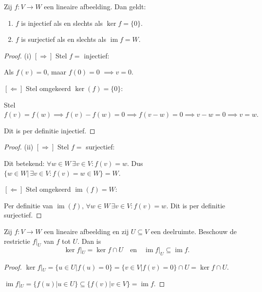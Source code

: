 \begin{lemma}[3.2.4]
    Zij $f \colon V \to W$ een lineaire afbeelding. Dan geldt:
    \begin{enumerate}
        \item[(i)] $f$ is injectief als en slechts als $\ker f = \{0\}$.
        \item[(ii)] $f$ is surjectief als en slechts als $\operatorname{im} f = W$.
    \end{enumerate}
\end{lemma}
\begin{proof}(i)
    \([\Rightarrow]\) Stel \(f = \) injectief:

    Als \(f(v) = 0\), maar \(f(0) = 0\)
    \(\implies v = 0\).

    \([\Leftarrow]\) Stel omgekeerd \(\ker (f) = \{0\}\):

    Stel
    \(
        f(v) = f(w)
         \implies f(v) - f(w) = 0
            \implies f(v-w) = 0
         \implies v-w = 0
         \implies v = w.
    \)

    Dit is per definitie injectief.
\end{proof}
\begin{proof}(ii)
    \([\Rightarrow]\) Stel \(f = \) surjectief:

    Dit betekend: \(\forall w \in W \, \exists v \in V: f(v) = w\).
    Dus \(\{w \in W |\, \exists v \in V: f(v) = w \in W \} = W\).

    \([\Leftarrow]\) Stel omgekeerd \(\operatorname{im} (f) = W\):

    Per definitie van \(\operatorname{im}(f),\, \forall w \in W \,\exists v \in V: f(v) = w \).
    Dit is per definitie surjectief.
\end{proof}

\begin{lemma}[3.2.5]
    Zij $f \colon V \to W$ een lineaire afbeelding en zij $U \subseteq V$ een deelruimte. Beschouw de restrictie $f|_U$ van $f$ tot $U$. Dan is
    \[ \ker f|_U = \ker f \cap U \quad \text{en} \quad \operatorname{im} f|_U \subseteq \operatorname{im} f. \]
\end{lemma}
\begin{proof}
    \(\ker f|_U  = \{u \in U |f(u)=0\} = \{v \in V |f(v)=0\} \cap U= \ker f \cap U\).


    \(\operatorname{im}f|_U = \{f(u)|u\in U\} \subseteq \{f(v)|v\in V\} = \operatorname{im} f \).
\end{proof}

